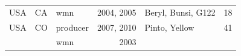 \documentclass[fleqn,10pt,lineno]{wlpeerj} %
\theoremstyle{definition}
\theoremstyle{definition}
\theoremstyle{definition}
\theoremstyle{remark}
\begin{document}
\begin{longtable}[]{@{}lllrlr@{}}
\begin{minipage}[t]{0.11\columnwidth}
USA\strut
\end{minipage} & \begin{minipage}[t]{0.08\columnwidth}\raggedright\strut
CA\strut
\end{minipage} & \begin{minipage}[t]{0.12\columnwidth}\raggedright\strut
wmn\strut
\end{minipage} & \begin{minipage}[t]{0.19\columnwidth}\raggedleft\strut
2004, 2005\strut
\end{minipage} & \begin{minipage}[t]{0.29\columnwidth}\raggedright\strut
Beryl, Bunsi, G122\strut
\end{minipage} & \begin{minipage}[t]{0.04\columnwidth}\raggedleft\strut
18\strut
\end{minipage}\tabularnewline
\begin{minipage}[t]{0.11\columnwidth}\raggedright\strut
USA\strut
\end{minipage} & \begin{minipage}[t]{0.08\columnwidth}\raggedright\strut
CO\strut
\end{minipage} & \begin{minipage}[t]{0.12\columnwidth}\raggedright\strut
producer\strut
\end{minipage} & \begin{minipage}[t]{0.19\columnwidth}\raggedleft\strut
2007, 2010\strut
\end{minipage} & \begin{minipage}[t]{0.29\columnwidth}\raggedright\strut
Pinto, Yellow\strut
\end{minipage} & \begin{minipage}[t]{0.04\columnwidth}\raggedleft\strut
41\strut
\end{minipage}\tabularnewline
\begin{minipage}[t]{0.11\columnwidth}\raggedright\strut
\strut
\end{minipage} & \begin{minipage}[t]{0.08\columnwidth}\raggedright\strut
\strut
\end{minipage} & \begin{minipage}[t]{0.12\columnwidth}\raggedright\strut
wmn\strut
\end{minipage} & \begin{minipage}[t]{0.19\columnwidth}\raggedleft\strut
2003\strut
\end{minipage} & \begin{minipage}[t]{0.29\columnwidth}\raggedright\strut

\end{minipage}
\end{longtable}
\end{document}
